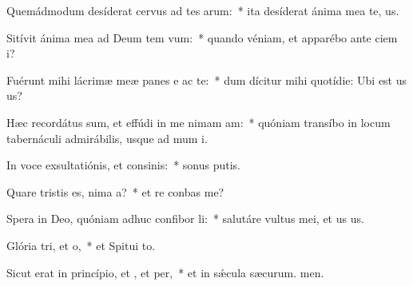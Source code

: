 \item Quemádmodum desíderat cervus ad tes arum:~* ita desíderat ánima mea  te, us.
\item Sitívit ánima mea ad Deum tem vum:~* quando véniam, et apparébo ante ciem i?
\item Fuérunt mihi lácrimæ meæ panes e ac te:~* dum dícitur mihi quotídie: Ubi est us us?
\item Hæc recordátus sum, et effúdi in me nimam am:~* quóniam transíbo in locum tabernáculi admirábilis, usque ad mum i.
\item In voce exsultatiónis, et consinis:~* sonus putis.
\item Quare tristis es, nima a?~* et re conbas me?
\item Spera in Deo, quóniam adhuc confibor li:~* salutáre vultus mei, et us us.
\item Glória tri, et o,~* et Spitui to.
\item Sicut erat in princípio, et , et per,~* et in sǽcula sæcurum. men.
